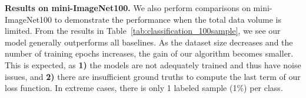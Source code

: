 \noindent \textbf{Results on mini-ImageNet100.} We also perform comparisons on mini-ImageNet100 to demonstrate the performance when the total data volume is limited.
%
From the results in Table~\ref{tab:classification_100sample}, we see our model generally outperforms all baselines. 
%
As the dataset size decreases and the number of training epochs increases, the gain of our algorithm becomes smaller. This is expected, as \textbf{1)} the models are not adequately trained and thus have noise issues, and \textbf{2)} there are insufficient ground truths to compute the last term of our loss function. In extreme cases, there is only 1 labeled sample (1\%) per class.







